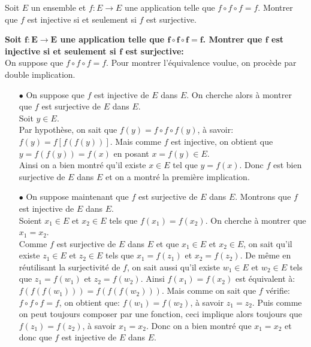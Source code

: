 \documentclass[a4paper, 11pt,reqno]{article}
\begin{document}
\begin{exercice}  \;
	Soit $E$ un ensemble et $f: E\rightarrow E$ une application telle que $f\circ f\circ f=f$. Montrer que $f$ est injective si et seulement si $f$ est surjective.
\end{exercice}
\begin{correction} \;
	\textbf{Soit $\mathbf{f: E\rightarrow E}$ une application telle que $\mathbf{f\circ f\circ f=f}$. Montrer que $\mathbf{f}$ est injective si et seulement si $\mathbf{f}$ est surjective:}\\
	\noindent On suppose que $f\circ f\circ f=f$. Pour montrer l'\'equivalence voulue, on proc\`{e}de par double implication.
	\begin{itemize}
		\item[$\bullet$] On suppose que $f$ est injective de $E$ dans $E$. On cherche alors \`{a} montrer que $f$ est surjective de $E$ dans $E$.\\
			\noindent Soit $y\in E$.\\
			\noindent Par hypoth\`{e}se, on sait que $f(y)=f\circ f\circ f(y)$, \`{a} savoir: $f(y)=f\left\lbrack f(f(y)) \right\rbrack$. Mais comme $f$ est injective, on obtient que $y=f(f(y))=f(x)$ en posant $x=f(y)\in E$.\\
			\noindent Ainsi on a bien montr\'e qu'il existe $x\in E$ tel que $y=f(x)$. Donc $f$ est bien surjective de $E$ dans $E$ et on a montr\'e la premi\`{e}re implication.
		\item[$\bullet$] On suppose maintenant que $f$ est surjective de $E$ dans $E$. Montrons que $f$ est injective de $E$ dans $E$. \\
			\noindent Soient $x_1\in E$ et $x_2\in E$ tels que $f(x_1)=f(x_2)$. On cherche \`{a} montrer que $x_1=x_2$. \\
			\noindent Comme $f$ est surjective de $E$ dans $E$ et que $x_1\in E$ et $x_2\in E$, on sait qu'il existe $z_1\in E$ et $z_2\in E$ tels que $x_1=f(z_1)$ et $x_2=f(z_2)$. De m\^{e}me en r\'eutilisant la surjectivit\'e de $f$, on sait aussi qu'il existe $w_1\in E$ et $w_2\in E$ tels que $z_1=f(w_1)$ et $z_2=f(w_2)$. Ainsi $f(x_1)=f(x_2)$ est \'equivalent \`{a}:
			$f( f( f( w_1)) )=f( f( f( w_2)) )$. Mais comme on sait que $f$ v\'erifie: $f\circ f\circ f=f$, on obtient que: $f(w_1)=f(w_2)$, \`{a} savoir $z_1=z_2$. Puis comme on peut toujours composer par une fonction, ceci implique alors toujours que $f(z_1)=f(z_2)$, \`{a} savoir $x_1=x_2$. Donc on a bien montr\'e que $x_1=x_2$ et donc que $f$ est injective de $E$ dans $E$.
	\end{itemize}
\end{correction}
\end{document}
